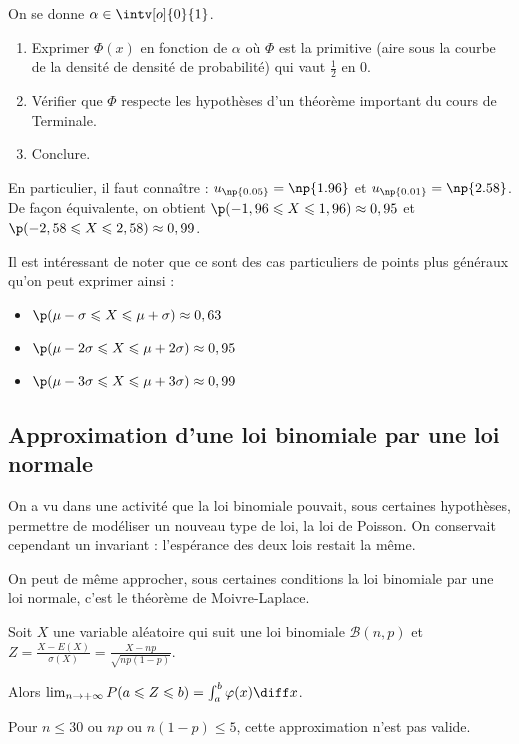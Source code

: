 \documentclass[11pt,a4paper,french]{article}
\begin{document}
\begin{question}
  On se donne $\alpha \in \intv[o]{0}{1}$.
  \begin{enumerate}
    \item Exprimer $\Phi(x)$ en fonction de $\alpha$ où $\Phi$ est la
      primitive (aire sous la courbe de la densité de densité de
      probabilité) qui vaut $\frac12$ en 0.
    \item Vérifier que $\Phi$ respecte les hypothèses d'un théorème
      important du cours de Terminale.
    \item Conclure.
  \end{enumerate}
\end{question}

En particulier, il faut connaître : $u_{\np{0.05}} = \np{1.96}$ et
$u_{\np{0.01}} = \np{2.58}$. De façon équivalente, on obtient $\p(-1,96
\leqslant X \leqslant 1,96) \approx 0,95$ et $\p(-2,58 \leqslant X
\leqslant 2,58) \approx 0,99$.

Il est intéressant de noter que ce sont des cas particuliers de points
plus généraux qu'on peut exprimer ainsi :
\begin{itemize}
  \item $\p(\mu - \sigma \leqslant X \leqslant \mu + \sigma) \approx
    0,63$
  \item $\p(\mu - 2\sigma \leqslant X \leqslant \mu + 2\sigma) \approx
    0,95$
  \item $\p(\mu - 3\sigma \leqslant X \leqslant \mu + 3\sigma) \approx
    0,99$
\end{itemize}

\pagebreak

\subsection{Approximation d'une loi binomiale par une loi normale}

On a vu dans une activité que la loi binomiale pouvait, sous certaines
hypothèses, permettre de modéliser un nouveau type de loi, la loi de
Poisson. On conservait cependant un invariant : l'espérance des deux
lois restait la même.

On peut de même approcher, sous certaines conditions la loi binomiale
par une loi normale, c'est le théorème de Moivre-Laplace.

\begin{theoreme}[Admis]
  Soit $X$ une variable aléatoire qui suit une loi binomiale
  $\mathcal{B}(n,p)$ et $Z = \frac{X - E(X)}{\sigma(X)} = \frac{X -
  np}{\sqrt{np(1-p)}}$.

  Alors $\lim_{n\to+\infty} P(a \leqslant Z \leqslant b) = \int_a^b
  \varphi(x) \diff x$.
\end{theoreme}

\begin{remarque}
  Pour $n \leqslant 30$ ou $np$ ou $n(1-p) \leqslant 5$, cette
  approximation n'est pas valide.
\end{remarque}
\end{document}
